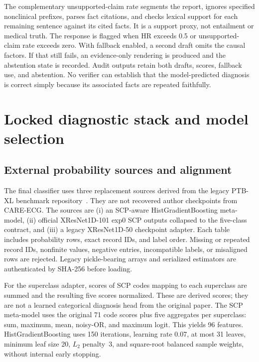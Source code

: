 \documentclass[11pt,a4paper]{article}
\begin{document}
The complementary unsupported-claim rate segments the report, ignores specified nonclinical prefixes, parses fact citations, and checks lexical support for each remaining sentence against its cited facts. It is a support proxy, not entailment or medical truth. The response is flagged when HR exceeds 0.5 or unsupported-claim rate exceeds zero. With fallback enabled, a second draft omits the causal factors. If that still fails, an evidence-only rendering is produced and the abstention state is recorded. Audit outputs retain both drafts, scores, fallback use, and abstention. No verifier can establish that the model-predicted diagnosis is correct simply because its associated facts are repeated faithfully.

\section{Locked diagnostic stack and model selection}
\label{sec:stack}
\subsection{External probability sources and alignment}
The final classifier uses three replacement sources derived from the legacy PTB-XL benchmark repository~\cite{benchmark}. They are not recovered author checkpoints from CARE-ECG. The sources are (i) an SCP-aware HistGradientBoosting meta-model, (ii) official XResNet1D-101 exp0 SCP outputs collapsed to the five-class contract, and (iii) a legacy XResNet1D-50 checkpoint adapter. Each table includes probability rows, exact record IDs, and label order. Missing or repeated record IDs, nonfinite values, negative entries, incompatible labels, or misaligned rows are rejected. Legacy pickle-bearing arrays and serialized estimators are authenticated by SHA-256 before loading.

For the superclass adapter, scores of SCP codes mapping to each superclass are summed and the resulting five scores normalized. These are derived scores; they are not a learned categorical diagnosis head from the original paper. The SCP meta-model uses the original 71 code scores plus five aggregates per superclass: sum, maximum, mean, noisy-OR, and maximum logit. This yields 96 features. HistGradientBoosting uses 150 iterations, learning rate 0.07, at most 31 leaves, minimum leaf size 20, $L_2$ penalty~3, and square-root balanced sample weights, without internal early stopping.
\end{document}
